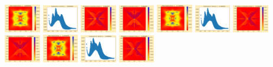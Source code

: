 \documentclass[11pt]{article}
\begin{document}
\vskip 10pt 
\includegraphics[width=0.11875\textwidth]{frame0060fig0.png}
\includegraphics[width=0.11875\textwidth]{frame0060fig1.png}
\includegraphics[width=0.11875\textwidth]{frame0060fig2.png}
\includegraphics[width=0.11875\textwidth]{frame0060fig3.png}
\includegraphics[width=0.11875\textwidth]{frame0061fig0.png}
\includegraphics[width=0.11875\textwidth]{frame0061fig1.png}
\includegraphics[width=0.11875\textwidth]{frame0061fig2.png}
\includegraphics[width=0.11875\textwidth]{frame0061fig3.png}
\vskip 10pt 
\includegraphics[width=0.11875\textwidth]{frame0062fig0.png}
\includegraphics[width=0.11875\textwidth]{frame0062fig1.png}
\includegraphics[width=0.11875\textwidth]{frame0062fig2.png}
\end{document}

